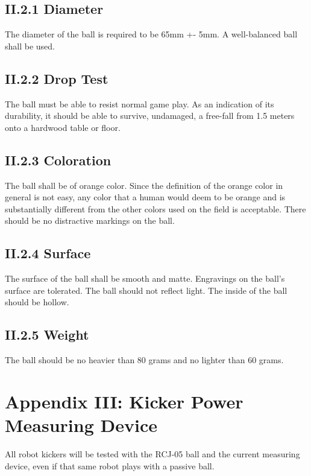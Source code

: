 \documentclass{article}
\begin{document}
\subsection{II.2.1 Diameter}

\textcolor{color-5}{The diameter of the ball is required to be 65mm +- 5mm. A well-balanced ball shall be used.}

\subsection{II.2.2 Drop Test}

The ball must be able to resist normal game play. As an indication of its durability, it should be able to survive, undamaged, a free-fall from 1.5 meters onto a hardwood table or floor.

\subsection{II.2.3 Coloration}

The ball shall be of orange color. Since the definition of the orange color in general is not easy, any color that a human would deem to be orange and is substantially different from the other colors used on the field is acceptable. There should be no distractive markings on the ball.

\subsection{II.2.4 Surface}

The surface of the ball shall be smooth and matte. Engravings on the ball's surface are tolerated. The ball should not reflect light. The inside of the ball should be hollow.

\subsection{II.2.5 Weight}

The ball should be no heavier than 80 grams and no lighter than 60 grams.

\section{Appendix III: Kicker Power Measuring Device\label{ref-064}}

All robot kickers will be tested with the RCJ-05 ball and the current measuring device, even if that same robot plays with a passive ball.
\end{document}
